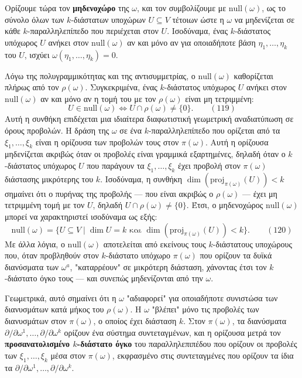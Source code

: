 \documentclass[12pt]{article}
\begin{document}
Ορίζουμε τώρα τον \textbf{μηδενοχώρο} της $\omega$, και τον συμβολίζουμε με $\text{null}(\omega)$, ως το σύνολο όλων των $k$-διάστατων υποχώρων $U \subseteq V$ τέτοιων ώστε η $\omega$ να μηδενίζεται σε κάθε $k$-παραλληλεπίπεδο που περιέχεται στον $U$. Ισοδύναμα, ένας $k$-διάστατος υπόχωρος $U$ ανήκει στον $\text{null}(\omega)$ αν και μόνο αν για οποιαδήποτε βάση $\eta_1, \dots, \eta_k$ του $U$, ισχύει $\omega(\eta_1, \dots, \eta_k) = 0$.

Λόγω της πολυγραμμικότητας και της αντισυμμετρίας, ο $\text{null}(\omega)$ καθορίζεται πλήρως από τον $\rho(\omega)$. Συγκεκριμένα, ένας $k$-διάστατος υπόχωρος $U$ ανήκει στον $\text{null}(\omega)$ αν και μόνο αν η τομή του με τον $\rho(\omega)$ είναι μη τετριμμένη:
\begin{equation}
U \in \text{null}(\omega) \iff U \cap \rho(\omega) \neq \{0\}. \qquad (119)
\end{equation}
Αυτή η συνθήκη επιδέχεται μια ιδιαίτερα διαφωτιστική γεωμετρική αναδιατύπωση σε όρους προβολών. Η δράση της $\omega$ σε ένα $k$-παραλληλεπίπεδο που ορίζεται από τα $\xi_1, \dots, \xi_k$ είναι η ορίζουσα των προβολών τους στον $\pi(\omega)$. Αυτή η ορίζουσα μηδενίζεται ακριβώς όταν οι προβολές είναι γραμμικά εξαρτημένες, δηλαδή όταν ο $k$-διάστατος υπόχωρος $U$ που παράγουν τα $\xi_1, \dots, \xi_k$ έχει προβολή στον $\pi(\omega)$ διάστασης μικρότερης του $k$. Ισοδύναμα, η συνθήκη $\dim(\text{proj}_{\pi(\omega)}(U)) < k$ σημαίνει ότι ο πυρήνας της προβολής — που είναι ακριβώς ο $\rho(\omega)$ — έχει μη τετριμμένη τομή με τον $U$, δηλαδή $U \cap \rho(\omega) \neq \{0\}$. Έτσι, ο μηδενοχώρος $\text{null}(\omega)$ μπορεί να χαρακτηριστεί ισοδύναμα ως εξής:
\begin{equation}
\text{null}(\omega) = \{ U \subseteq V \mid \dim U = k \text{ και } \dim(\text{proj}_{\pi(\omega)}(U)) < k \}. \qquad (120)
\end{equation}
Με άλλα λόγια, ο $\text{null}(\omega)$ αποτελείται από εκείνους τους $k$-διάστατους υποχώρους που, όταν προβληθούν στον $k$-διάστατο υπόχωρο $\pi(\omega)$ που ορίζουν τα δυϊκά διανύσματα των $\omega^a$, "καταρρέουν" σε μικρότερη διάσταση, χάνοντας έτσι τον $k$-διάστατο όγκο τους — και συνεπώς μηδενίζονται από την $\omega$.

Γεωμετρικά, αυτό σημαίνει ότι η $\omega$ "αδιαφορεί" για οποιαδήποτε συνιστώσα των διανυσμάτων κατά μήκος του $\rho(\omega)$. Η $\omega$ "βλέπει" μόνο τις προβολές των διανυσμάτων στον $\pi(\omega)$, ο οποίος έχει διάσταση $k$. Στον $\pi(\omega)$, τα διανύσματα $\partial / \partial \omega^1, \dots, \partial / \partial \omega^k$ ορίζουν ένα σύστημα συντεταγμένων, και η ορίζουσα μετρά τον \textbf{προσανατολισμένο $k$-διάστατο όγκο} του παραλληλεπιπέδου που ορίζουν οι προβολές των $\xi_1, \dots, \xi_k$ μέσα στον $\pi(\omega)$, εκφρασμένο στις συντεταγμένες που ορίζουν τα ίδια τα $\partial / \partial \omega^1, \dots, \partial / \partial \omega^k$.
\end{document}
